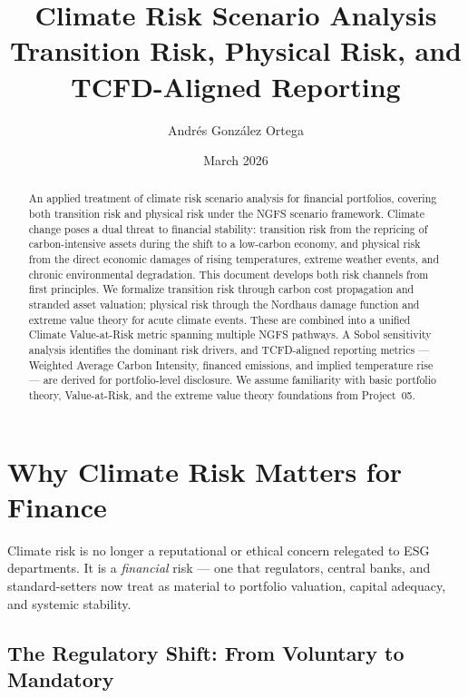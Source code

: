 \documentclass[11pt, a4paper]{article}
\title{%
    \textbf{Climate Risk Scenario Analysis} \\[0.5em]
    \large Transition Risk, Physical Risk, and TCFD-Aligned Reporting
}
\author{Andr\'es Gonz\'alez Ortega}
\date{March 2026}
\theoremstyle{definition}
\theoremstyle{plain}
\theoremstyle{remark}
\begin{document}
\maketitle

\begin{abstract}
An applied treatment of climate risk scenario analysis for financial portfolios,
covering both transition risk and physical risk under the NGFS scenario framework.
Climate change poses a dual threat to financial stability: transition risk from the
repricing of carbon-intensive assets during the shift to a low-carbon economy, and
physical risk from the direct economic damages of rising temperatures, extreme weather
events, and chronic environmental degradation.
This document develops both risk channels from first principles.
We formalize transition risk through carbon cost propagation and stranded asset
valuation; physical risk through the Nordhaus damage function and extreme value theory
for acute climate events.
These are combined into a unified Climate Value-at-Risk metric spanning multiple
NGFS pathways.
A Sobol sensitivity analysis identifies the dominant risk drivers, and TCFD-aligned
reporting metrics --- Weighted Average Carbon Intensity, financed emissions, and
implied temperature rise --- are derived for portfolio-level disclosure.
We assume familiarity with basic portfolio theory, Value-at-Risk, and the extreme
value theory foundations from Project~05.
\end{abstract}

\tableofcontents
\newpage

\section{Why Climate Risk Matters for Finance}
\label{sec:why-climate}

Climate risk is no longer a reputational or ethical concern relegated to ESG
departments.
It is a \emph{financial} risk --- one that regulators, central banks, and
standard-setters now treat as material to portfolio valuation, capital adequacy,
and systemic stability.

\subsection{The Regulatory Shift: From Voluntary to Mandatory}
\end{document}
